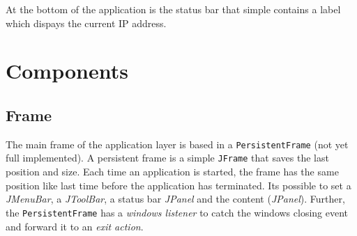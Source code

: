 At the bottom of the application is the status bar that simple contains a label which dispays the current IP address.

\section{Components}
\label{applicationlayer_component_desc}

\subsection{Frame}
\label{applicationlayer_frame_desc}
The main frame of the application layer is based in a \texttt{PersistentFrame} (not yet full implemented). A persistent frame is a simple \texttt{JFrame} that saves the last position and size. Each time an application is started, the frame has the same position like last time before the application has terminated. Its possible to set a \textit{JMenuBar}, a \textit{JToolBar}, a status bar \textit{JPanel} and the content (\textit{JPanel}). Further, the \texttt{PersistentFrame} has a \textit{windows listener} to catch the windows closing event and forward it to an \textit{exit action}.

